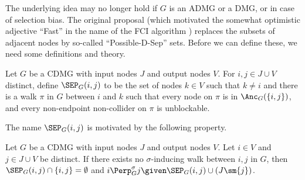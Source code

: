 The underlying idea may no longer hold if $G$ is an ADMG or a DMG, or in case of selection bias.
The original proposal (which motivated the somewhat optimistic adjective ``Fast'' in the name of the FCI algorithm \cite{SMR1995}) replaces the subsets of adjacent nodes by so-called ``Possible-D-Sep'' sets. 
Before we can define these, we need some definitions and theory.

\begin{Def}\label{def:SEP}
  Let $G$ be a CDMG with input nodes $J$ and output nodes $V$.
  For $i,j \in J \cup V$ distinct, define $\SEP_G(i,j)$ to be the set of nodes $k \in V$ such that
  $k \ne i$ and there is a walk $\pi$ in $G$ between $i$ and $k$ such that every node
  on $\pi$ is in $\Anc_G(\{i,j\})$, and every non-endpoint non-collider on $\pi$ is unblockable.
\end{Def}
The name $\SEP_G(i,j)$ is motivated by the following property.
\begin{Prp}\label{prp:SEP}
  Let $G$ be a CDMG with input nodes $J$ and output nodes $V$.
  Let $i \in V$ and $j \in J \cup V$ be distinct.
  If there exists no $\sigma$-inducing walk between $i,j$ in $G$, then $\SEP_G(i,j) \cap \{i,j\} = \emptyset$ and $i \Perp^\sigma_G j \given \SEP_G(i,j) \cup (J \sm \{j\})$.
\end{Prp}

